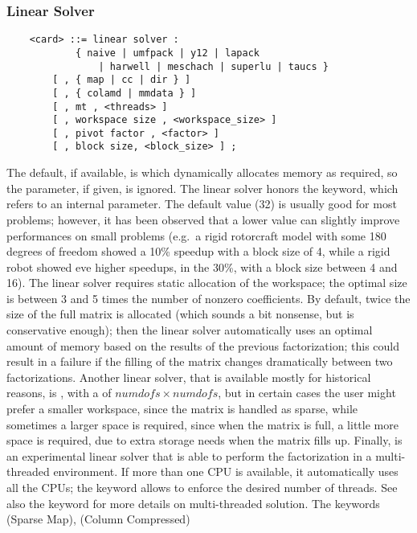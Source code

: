 \subsubsection{Linear Solver}   
\label{sec:LINEAR-SOLVER}
\begin{verbatim}
    <card> ::= linear solver :
            { naive | umfpack | y12 | lapack 
                | harwell | meschach | superlu | taucs }
        [ , { map | cc | dir } ]
        [ , { colamd | mmdata } ]
        [ , mt , <threads> ]
        [ , workspace size , <workspace_size> ] 
        [ , pivot factor , <factor> ]
        [ , block size, <block_size> ] ;
\end{verbatim}
The default, if available, is  which dynamically
allocates memory as required, so the  
parameter, if given, is ignored.
The  linear solver honors the  keyword,
which refers to an internal parameter.
The default value (32) is usually good for most problems; however,
it has been observed that a lower value can slightly improve
performances on small problems (e.g.\ a rigid rotorcraft model
with some 180 degrees of freedom showed a 10\% speedup with 
a block size of 4, while a rigid robot showed eve higher speedups,
in the 30\%, with a block size between 4 and 16).
The  linear solver requires static allocation of the workspace;
the optimal size is between 3 and 5 times the number of nonzero 
coefficients.
By default, twice the size of the full matrix is allocated
(which sounds a bit nonsense, but is conservative enough);
then the linear solver automatically uses an optimal amount of memory
based on the results of the previous factorization; this could
result in a failure if the filling of the matrix changes 
dramatically between two factorizations.
Another linear solver, that is available mostly for historical reasons, 
is , with a 
of $ numdofs\times{numdofs} $, but in certain cases the user
might prefer a smaller workspace, since the matrix is handled as sparse,
while sometimes a larger space is required, since when the matrix is
full, a little more space is required, due to extra storage needs when
the matrix fills up.
Finally,  is an experimental linear solver that is able to perform
the factorization in a multi-threaded environment.
If more than one CPU is available, it automatically uses all the CPUs;
the keyword  allows to enforce the desired number of threads.
See also the  keyword for more details on multi-threaded
solution.
The keywords  (Sparse Map),  (Column Compressed)
